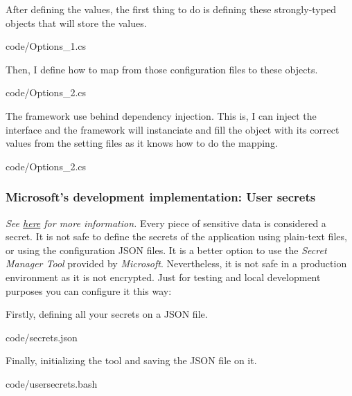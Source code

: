             After defining the values, the first thing to do is defining these strongly-typed objects that will store the values. 
            
            {code/Options_1.cs}
            
            Then, I define how to map from those configuration files to these objects.
            
            {code/Options_2.cs}

            The framework use behind dependency injection. This is, I can inject the interface and the framework will instanciate and fill the object with 
            its correct values from the setting files as it knows how to do the mapping.
            
            {code/Options_2.cs}

        \subsubsection{Microsoft's development implementation: User secrets}
            \textit{See \href{https://docs.microsoft.com/en-us/aspnet/core/security/app-secrets?view=aspnetcore-5.0&tabs=windows}{here} for more information.} 
            Every piece of sensitive data is considered a secret. It is not safe to define the secrets of the application using plain-text files, 
            or using the configuration JSON files. It is a better option to use the \textit{Secret Manager Tool} provided by \textit{Microsoft}.
            Nevertheless, it is not safe in a production environment as it is not encrypted. Just for testing and local development 
            purposes you can configure it this way:

            Firstly, defining all your secrets on a JSON file.
            
            {code/secrets.json}

            Finally, initializing the tool and saving the JSON file on it.
            
            {code/usersecrets.bash}

